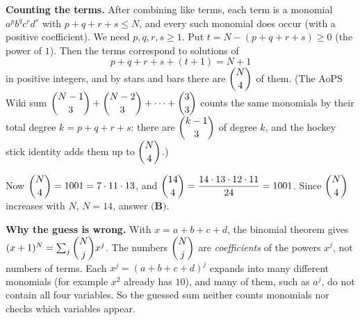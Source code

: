 \textbf{Counting the terms.} After combining like terms, each term is a monomial $a^pb^qc^rd^s$ with $p+q+r+s\le N$, and every such monomial does occur (with a positive coefficient). We need $p,q,r,s\ge1$. Put $t=N-(p+q+r+s)\ge0$ (the power of $1$). Then the terms correspond to solutions of
\[
p+q+r+s+(t+1)=N+1
\]
in positive integers, and by stars and bars there are $\dbinom{N}{4}$ of them. (The AoPS Wiki sum $\dbinom{N-1}{3}+\dbinom{N-2}{3}+\cdots+\dbinom{3}{3}$ counts the same monomials by their total degree $k=p+q+r+s$: there are $\dbinom{k-1}{3}$ of degree $k$, and the hockey stick identity adds them up to $\dbinom{N}{4}$.)

Now $\dbinom{N}{4}=1001=7\cdot11\cdot13$, and $\dbinom{14}{4}=\dfrac{14\cdot13\cdot12\cdot11}{24}=1001$. Since $\dbinom{N}{4}$ increases with $N$, $N=14$, answer $\boxed{\textbf{(B)}}$.

\textbf{Why the guess is wrong.} With $x=a+b+c+d$, the binomial theorem gives $(x+1)^N=\sum_j\dbinom{N}{j}x^j$. The numbers $\dbinom{N}{j}$ are \emph{coefficients} of the powers $x^j$, not numbers of terms. Each $x^j=(a+b+c+d)^j$ expands into many different monomials (for example $x^2$ already has $10$), and many of them, such as $a^j$, do not contain all four variables. So the guessed sum neither counts monomials nor checks which variables appear.
